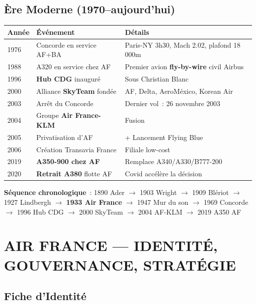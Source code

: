 \documentclass[11pt,a4paper]{article}
\begin{document}
\subsection{Ère Moderne (1970--aujourd'hui)}

\begin{longtable}{p{1cm}p{4cm}p{9.5cm}}
\toprule
\textbf{Année} & \textbf{Événement} & \textbf{Détails} \\
\midrule
1976 & Concorde en service AF+BA & Paris-NY 3h30, Mach 2.02, plafond 18\,000m \\
1988 & A320 en service chez AF & Premier avion \textbf{fly-by-wire} civil Airbus \\
\rowcolor{aflight}
1996 & \textbf{Hub CDG} inauguré & Sous Christian Blanc \\
\rowcolor{aflight}
2000 & Alliance \textbf{SkyTeam} fondée & AF, Delta, AeroMéxico, Korean Air \\
2003 & Arrêt du Concorde & Dernier vol~: 26 novembre 2003 \\
\rowcolor{aflight}
2004 & Groupe \textbf{Air France-KLM} & Fusion \\
2005 & Privatisation d'AF & + Lancement Flying Blue \\
2006 & Création Transavia France & Filiale low-cost \\
\rowcolor{aflight}
2019 & \textbf{A350-900 chez AF} & Remplace A340/A330/B777-200 \\
\rowcolor{aflight}
2020 & \textbf{Retrait A380} flotte AF & Covid accélère la décision \\
\bottomrule
\end{longtable}

\begin{memobox}
\textbf{Séquence chronologique}~: 1890 Ader $\to$ 1903 Wright $\to$ 1909 Blériot $\to$ 1927 Lindbergh $\to$ \textbf{1933 Air France} $\to$ 1947 Mur du son $\to$ 1969 Concorde $\to$ 1996 Hub CDG $\to$ 2000 SkyTeam $\to$ 2004 AF-KLM $\to$ 2019 A350 AF
\end{memobox}

\section{AIR FRANCE --- IDENTITÉ, GOUVERNANCE, STRATÉGIE}

\subsection{Fiche d'Identité}
\end{document}
